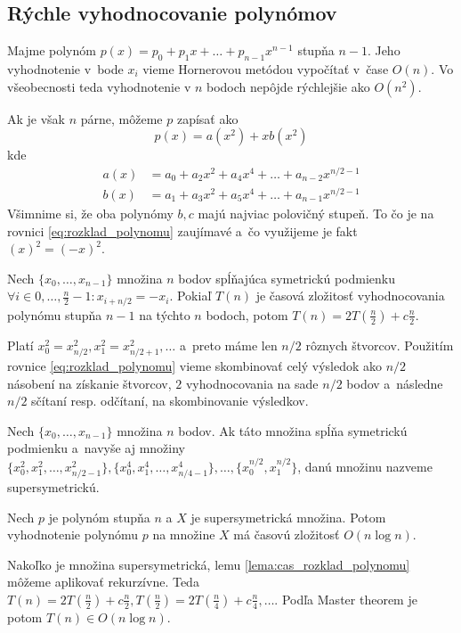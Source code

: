 \subsection{Rýchle vyhodnocovanie polynómov}

Majme polynóm $p(x)=p_0 + p_1 x + \dots + p_{n-1} x^{n-1}$ stupňa $n-1$.
Jeho vyhodnotenie v~bode $x_i$ vieme
Hornerovou metódou vypočítať v~čase $O(n)$. Vo všeobecnosti teda
vyhodnotenie v $n$ bodoch nepôjde rýchlejšie ako $O(n^2)$.

Ak je však $n$ párne, môžeme $p$ zapísať ako
\begin{equation}
    p(x) = a(x^2) + x b(x^2)
    \label{eq:rozklad_polynomu}
\end{equation}
kde
\begin{align*}
    a(x) &= a_0 + a_2 x^2 + a_4 x^4 + \dots + a_{n-2} x^{n/2-1} \\
    b(x) &= a_1 + a_3 x^2 + a_5 x^4 + \dots + a_{n-1} x^{n/2-1}
\end{align*}
Všimnime si, že oba polynómy $b,c$ majú najviac polovičný
stupeň.
To čo je na rovnici \eqref{eq:rozklad_polynomu} zaujímavé a~čo využijeme
je fakt $(x)^2 = (-x)^2$.

\begin{lema}
  Nech $\{x_0, \dots, x_{n-1}\}$ množina $n$ bodov spĺňajúca symetrickú
  podmienku $\forall i \in 0,\dots,\frac{n}{2}-1: x_{i+n/2}=-x_i $.
  Pokiaľ $T(n)$ je časová zložitosť vyhodnocovania polynómu stupňa
  $n-1$ na týchto $n$ bodoch, potom
  $T(n) = 2 T(\frac{n}{2}) + c \frac{n}{2}$.
  \label{lema:cas_rozklad_polynomu}
\end{lema}
\begin{dokaz}
  Platí $x_0^2 = x_{n/2}^2, x_1^2 = x_{n/2+1}^2, \dots$ a~preto
  máme len $n/2$ rôznych štvorcov. Použitím rovnice
  \eqref{eq:rozklad_polynomu} vieme skombinovať celý výsledok ako
  $n/2$ násobení na získanie štvorcov,  $2$ vyhodnocovania na sade $n/2$
  bodov a~následne $n/2$ sčítaní resp. odčítaní, na skombinovanie
  výsledkov.
\end{dokaz}

\begin{definicia}
  Nech $\{x_0, \dots, x_{n-1}\}$ množina $n$ bodov.
  Ak táto množina spĺňa symetrickú podmienku a~navyše aj množiny
  $\{x_0^2, x_1^2, \dots, x_{n/2-1}^2 \},
   \{x_0^4, x_1^4, \dots, x_{n/4-1}^4\}, \dots, \{x_0^{n/2},
   x_1^{n/2}\}$, danú množinu nazveme supersymetrickú.
\end{definicia}

\begin{lema}
    Nech $p$ je polynóm stupňa $n$ a $X$ je supersymetrická množina.
    Potom vyhodnotenie polynómu $p$ na množine $X$ má časovú zložitosť
    $O(n\log n)$.
\end{lema}
\begin{dokaz}
  Nakoľko je množina supersymetrická, lemu
  \ref{lema:cas_rozklad_polynomu} môžeme aplikovať rekurzívne.
  Teda
  $T(n) = 2 T(\frac{n}{2}) + c \frac{n}{2},
   T(\frac{n}{2}) = 2 T(\frac{n}{4}) + c \frac{n}{4}, \dots$.
  Podľa Master theorem je potom $T(n) \in O(n\log n)$.
\end{dokaz}

